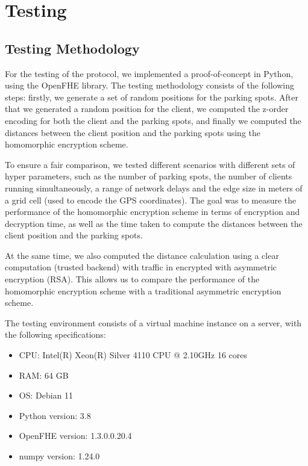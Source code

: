 
\chapter{Testing}
\section{Testing Methodology}

For the testing of the protocol, we implemented a proof-of-concept in Python, using the OpenFHE library\cite{openFHE}. The testing methodology consists of the following steps: firstly, we generate a set of random positions for the parking spots. After that we generated a random position for the client, we computed the z-order encoding for both the client and the parking spots, and finally we computed the distances between the client position and the parking spots using the homomorphic encryption scheme.

To ensure a fair comparison, we tested different scenarios with different sets of hyper parameters, such as the number of parking spots, the number of clients running simultaneously, a range of network delays and the edge size in meters of a grid cell (used to encode the GPS coordinates). The goal was to measure the performance of the homomorphic encryption scheme in terms of encryption and decryption time, as well as the time taken to compute the distances between the client position and the parking spots.

At the same time, we also computed the distance calculation using a clear computation (trusted backend) with traffic in encrypted with asymmetric encryption (RSA). This allows us to compare the performance of the homomorphic encryption scheme with a traditional asymmetric encryption scheme.

The testing environment consists of a virtual machine instance on a server, with the following specifications:
\begin{itemize}
    \item CPU: Intel(R) Xeon(R) Silver 4110 CPU @ 2.10GHz 16 cores
    \item RAM: 64 GB
    \item OS: Debian 11
    \item Python version: 3.8
    \item OpenFHE version: 1.3.0.0.20.4
    \item numpy version: 1.24.0
\end{itemize}

